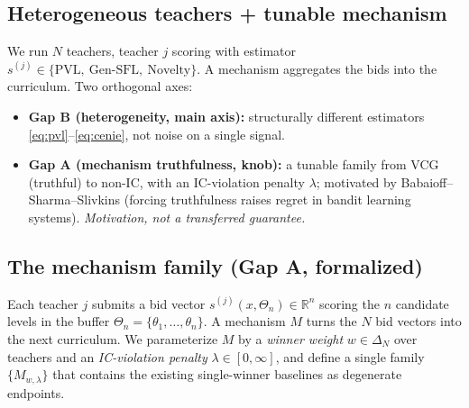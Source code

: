 \documentclass[11pt]{article}
\newcommand{\reals}{\mathbb{R}}
\newcommand{\simplex}{\Delta}
\newcommand{\level}{\theta}        %
\newcommand{\levelset}{\Theta}     %
\newcommand{\param}{x}             %
\newcommand{\score}{s}             %
\newcommand{\pvl}{\mathrm{PVL}}
\begin{document}
\subsection{Heterogeneous teachers + tunable mechanism}
We run $N$ teachers, teacher $j$ scoring with estimator $\score^{(j)}\in\{\pvl,\ \text{Gen-SFL},\ \text{Novelty}\}$. A mechanism aggregates the bids into the curriculum. Two orthogonal axes:
\begin{itemize}[topsep=2pt,itemsep=1pt]
  \item \textbf{Gap B (heterogeneity, main axis):} structurally different estimators \eqref{eq:pvl}--\eqref{eq:cenie}, not noise on a single signal.
  \item \textbf{Gap A (mechanism truthfulness, knob):} a tunable family from VCG (truthful) to non-IC, with an IC-violation penalty $\lambda$; motivated by Babaioff--Sharma--Slivkins (forcing truthfulness raises regret in bandit learning systems). \emph{Motivation, not a transferred guarantee.}
\end{itemize}

\subsection{The mechanism family (Gap A, formalized)}
\label{sec:mechanism}
Each teacher $j$ submits a bid vector $\score^{(j)}(\param,\levelset_n)\in\reals^n$ scoring the $n$ candidate levels in the buffer $\levelset_n=\{\level_1,\dots,\level_n\}$. A mechanism $M$ turns the $N$ bid vectors into the next curriculum. We parameterize $M$ by a \emph{winner weight} $w\in\simplex_N$ over teachers and an \emph{IC-violation penalty} $\lambda\in[0,\infty]$, and define a single family $\{M_{w,\lambda}\}$ that contains the existing single-winner baselines as degenerate endpoints.
\end{document}
